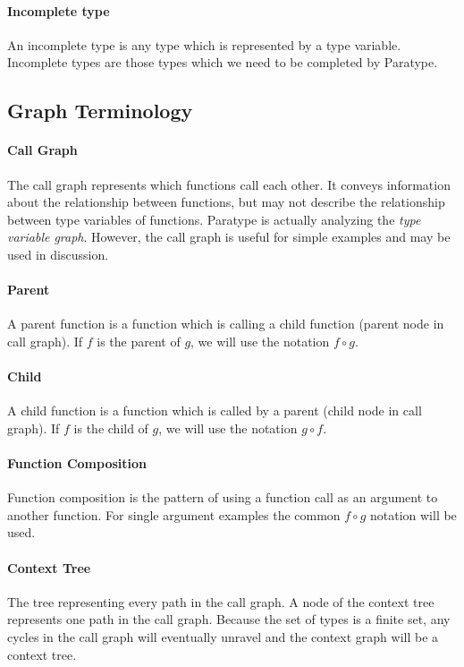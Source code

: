 \documentclass[10pt]{article}
\begin{document}
	\paragraph{Incomplete type}
	An incomplete type is any type which is represented by a type variable.
	Incomplete types are those types which we need to be completed by Paratype.
	
	
\subsection{Graph Terminology}
	\paragraph{Call Graph}
	The call graph represents which functions call each other. It conveys
	information about the relationship between functions, but may not describe
	the relationship between type variables of functions. Paratype is actually
	analyzing the \emph{type variable graph}. However, the call graph is useful
	for simple examples and may be used in discussion.
	
	\paragraph{Parent}
	A parent function is a function which is calling a child function (parent
	node in call graph). If $f$ is the parent of $g$, we will use the notation
	$f \circ g$.
	
	\paragraph{Child}
	A child function is a function which is called by a parent (child node in
	call graph). If $f$ is the child of $g$, we will use the notation $g \circ
	f$.
	
	\paragraph{Function Composition}
	Function composition is the pattern of using a function call as an argument
	to another function. For single argument examples the common $f \circ
	g$ notation will be used.
	
	\paragraph{Context Tree}
	The tree representing every path in the call graph. A node of the context
	tree represents one path in the call graph. Because the set of types is a
	finite set, any cycles in the call graph will eventually unravel and the
	context graph will be a context tree.
	
\end{document}
